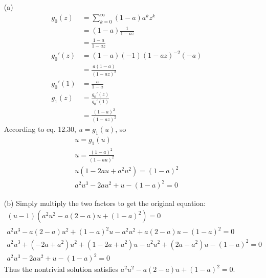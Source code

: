 \documentclass{article}
\begin{document}
\begin{enumerate}
  \item[(a)]
  \begin{align*}
    g_0(z) &= \sum_{k = 0}^{\infty} (1 - a) a^k z^k \\
    &= (1 - a) \frac{1}{1 - az} \\
    &= \frac{1 - a}{1 - az} \\
    g_0'(z) &= (1 - a)(-1)(1 - az)^{-2} (-a) \\
    &= \frac{a(1 - a)}{(1 - az)^2} \\
    g_0'(1) &= \frac{a}{1 - a} \\
    g_1(z) &= \frac{g_0'(z)}{g_0'(1)} \\
    &= \frac{(1 - a)^2}{(1 - az)^2}
  \end{align*}
  According to eq. 12.30, \( u = g_1(u) \), so
  \begin{gather*}
    u = g_1(u) \\
    u = \frac{(1 - a)^2}{(1 - au)^2} \\
    u(1 - 2au + a^2 u^2) = (1 - a)^2 \\
    a^2 u^3 - 2au^2 + u - (1 - a)^2 = 0
  \end{gather*}

  \item[(b)]
  Simply multiply the two factors to get the original equation:
  \begin{gather*}
    (u - 1)(a^2 u^2 - a(2 - a)u + (1 - a)^2) = 0 \\
    a^2 u^3 - a(2 - a)u^2 + (1 - a)^2 u - a^2 u^2 + a(2 - a)u - (1 - a)^2 = 0 \\
    a^2 u^3 + (-2a + a^2) u^2 + (1 - 2a + a^2) u - a^2 u^2 + (2a - a^2) u - (1 - a)^2 = 0 \\
    a^2 u^3 - 2au^2 + u - (1 - a)^2 = 0
  \end{gather*}
  Thus the nontrivial solution satisfies \( a^2 u^2 - a(2 - a)u + (1 - a)^2 = 0
  \).


\end{enumerate}
\end{document}
